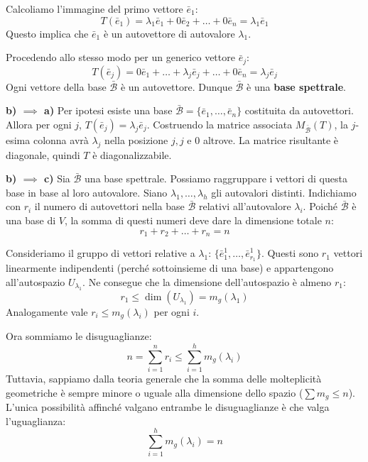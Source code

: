 {{        Calcoliamo l'immagine del primo vettore \(\bar{e}_1\):
        \[
        T(\bar{e}_1) = \lambda_1 \bar{e}_1 + 0 \bar{e}_2 + \dots + 0 \bar{e}_n = \lambda_1 \bar{e}_1
        \]
        Questo implica che \(\bar{e}_1\) è un autovettore di autovalore \(\lambda_1\).
        
        Procedendo allo stesso modo per un generico vettore \(\bar{e}_j\):
        \[
        T(\bar{e}_j) = 0 \bar{e}_1 + \dots + \lambda_j \bar{e}_j + \dots + 0 \bar{e}_n = \lambda_j \bar{e}_j
        \]
        Ogni vettore della base \(\bar{\mathcal{B}}\) è un autovettore. Dunque \(\bar{\mathcal{B}}\) è una \textbf{base spettrale}.

        \bigskip
        
        \textbf{b) \(\implies\) a)}
        Per ipotesi esiste una base \(\bar{\mathcal{B}} = \{\bar{e}_1, \dots, \bar{e}_n\}\) costituita da autovettori.
        Allora per ogni \(j\), \(T(\bar{e}_j) = \lambda_j \bar{e}_j\).
        Costruendo la matrice associata \(M_{\bar{\mathcal{B}}}(T)\), la \(j\)-esima colonna avrà \(\lambda_j\) nella posizione \(j,j\) e \(0\) altrove. La matrice risultante è diagonale, quindi \(T\) è diagonalizzabile.

        \bigskip

        \textbf{b) \(\implies\) c)}
        Sia \(\bar{\mathcal{B}}\) una base spettrale. Possiamo raggruppare i vettori di questa base in base al loro autovalore.
        Siano \(\lambda_1, \dots, \lambda_h\) gli autovalori distinti.
        Indichiamo con \(r_i\) il numero di autovettori nella base \(\bar{\mathcal{B}}\) relativi all'autovalore \(\lambda_i\).
        Poiché \(\bar{\mathcal{B}}\) è una base di \(V\), la somma di questi numeri deve dare la dimensione totale \(n\):
        \[ r_1 + r_2 + \dots + r_n = n \]
        
        Consideriamo il gruppo di vettori relative a \(\lambda_1\): \(\{ \bar{e}^1_1, \dots, \bar{e}^1_{r_1} \}\).
        Questi sono \(r_1\) vettori linearmente indipendenti (perché sottoinsieme di una base) e appartengono all'autospazio \(U_{\lambda_1}\).
        Ne consegue che la dimensione dell'autospazio è almeno \(r_1\):
        \[ r_1 \le \dim(U_{\lambda_1}) = m_g(\lambda_1) \]
        Analogamente vale \(r_i \le m_g(\lambda_i)\) per ogni \(i\).
        
        Ora sommiamo le disuguaglianze:
        \[ n = \sum_{i=1}^n r_i \le \sum_{i=1}^h m_g(\lambda_i) \]
        Tuttavia, sappiamo dalla teoria generale che la somma delle molteplicità geometriche è sempre minore o uguale alla dimensione dello spazio (\(\sum m_g \le n\)).
        L'unica possibilità affinché valgano entrambe le disuguaglianze è che valga l'uguaglianza:
        \[ \sum_{i=1}^h m_g(\lambda_i) = n \]

}}
